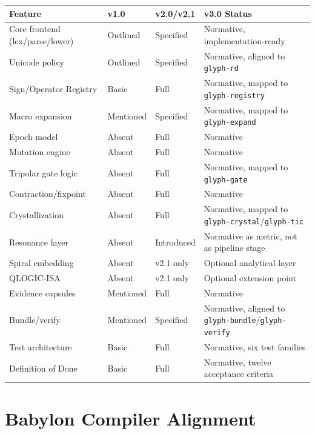 \documentclass[11pt,a4paper,twoside]{article}
\theoremstyle{definition}
\theoremstyle{remark}
\begin{document}
\begin{longtable}{p{3.5cm}p{2cm}p{2.5cm}p{5cm}}
\toprule
\textbf{Feature} & \textbf{v1.0} & \textbf{v2.0/v2.1} & \textbf{v3.0 Status} \\
\midrule
\endfirsthead
Core frontend (lex/parse/lower) & Outlined & Specified & Normative, implementation-ready \\
Unicode policy & Outlined & Specified & Normative, aligned to \texttt{glyph-rd} \\
Sign/Operator Registry & Basic & Full & Normative, mapped to \texttt{glyph-registry} \\
Macro expansion & Mentioned & Specified & Normative, mapped to \texttt{glyph-expand} \\
Epoch model & Absent & Full & Normative \\
Mutation engine & Absent & Full & Normative \\
Tripolar gate logic & Absent & Full & Normative, mapped to \texttt{glyph-gate} \\
Contraction/fixpoint & Absent & Full & Normative \\
Crystallization & Absent & Full & Normative, mapped to \texttt{glyph-crystal}/\texttt{glyph-tic} \\
Resonance layer & Absent & Introduced & Normative as metric, not as pipeline stage \\
Spiral embedding & Absent & v2.1 only & Optional analytical layer \\
QLOGIC-ISA & Absent & v2.1 only & Optional extension point \\
Evidence capsules & Mentioned & Full & Normative \\
Bundle/verify & Mentioned & Specified & Normative, aligned to \texttt{glyph-bundle}/\texttt{glyph-verify} \\
Test architecture & Basic & Full & Normative, six test families \\
Definition of Done & Basic & Full & Normative, twelve acceptance criteria \\
\bottomrule
\end{longtable}



\section{Babylon Compiler Alignment}
\label{sec:babylon-alignment}
\end{document}
